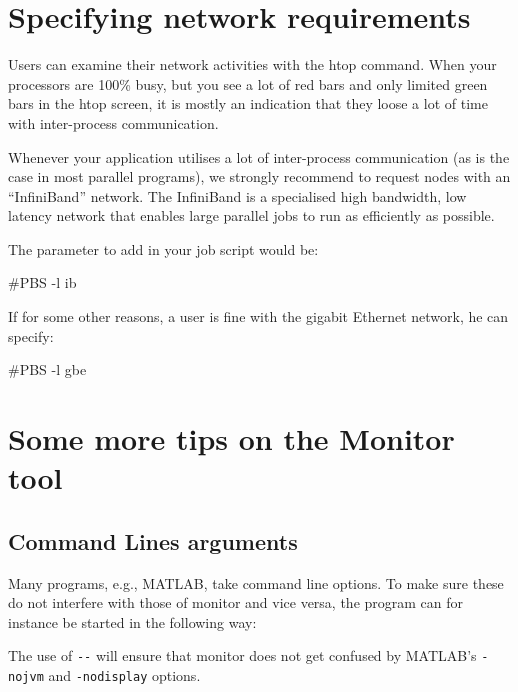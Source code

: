 \section{Specifying network requirements}

Users can examine their network activities with the htop command. When your
processors are 100\% busy, but you see a lot of red bars and only limited green
bars in the htop screen, it is mostly an indication that they loose a lot of
time with inter-process communication.

Whenever your application utilises a lot of inter-process communication (as is
the case in most parallel programs), we strongly recommend to request nodes
with an ``InfiniBand'' network. The InfiniBand is a specialised high bandwidth,
low latency network that enables large parallel jobs to run as efficiently as
possible.

The parameter to add in your job script would be:

\begin{prompt}
#PBS -l ib
\end{prompt}

If for some other reasons, a user is fine with the gigabit Ethernet network, he
can specify:

\begin{prompt}
#PBS -l gbe
\end{prompt}

\ifgent
\else
  \section{Some more tips on the Monitor tool}

  \subsection{Command Lines arguments}

  Many programs, e.g., MATLAB, take command line options. To make sure these do
  not interfere with those of monitor and vice versa, the program can for
  instance be started in the following way:

\begin{prompt}
\end{prompt}

  The use of \lstinline|--| will ensure that monitor does not get confused by MATLAB's \lstinline|-nojvm| and \lstinline|-nodisplay| options.

